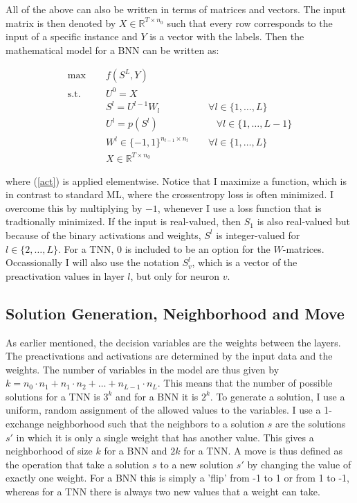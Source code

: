 \noindent All of the above can also be written in terms of matrices and vectors. The input matrix is then denoted by $X \in \mathbb{R}^{T \times n_0}$ such that every row corresponds to the input of a specific instance and $Y$ is a vector with the labels. Then the mathematical model for a BNN can be written as:

\begin{align}
    \label{obj} \max \;\quad  & f(S^L, Y) \\
    \label{c1} \mbox{s.t.}\quad  & U^0 = X \\
    \label{c2} & S^l = U^{l-1}W_l \quad \quad \quad \quad \quad \forall l \in \{1, \ldots, L\} \\
    \label{c3} & U^l = p(S^l) \quad \quad \quad \quad \quad \quad \forall l \in \{1, \ldots, L- 1\} \\
    \label{c4} & W^l \in \{-1, 1\}^{n_{l-1} \times n_l} \quad \quad \forall l \in \{1, \ldots, L\} \\
    \label{c5} & X \in \mathbb{R}^{T \times n_0}
\end{align}

\noindent where (\ref{act}) is applied elementwise. Notice that I maximize a function, which is in contrast to standard ML, where the crossentropy loss is often minimized. I overcome this by multiplying by $-1$, whenever I use a loss function that is tradtionally minimized. If the input is real-valued, then $S_1$ is also real-valued but because of the binary activations and weights, $S^l$ is integer-valued for $l\in \{2, \ldots, L\}$. For a TNN, 0 is included to be an option for the $W$-matrices. Occassionally I will also use the notation $S^l_v$, which is a vector of the preactivation values in layer $l$, but only for neuron $v$. 

\subsection{Solution Generation, Neighborhood and Move}

As earlier mentioned, the decision variables are the weights between the layers. The preactivations and activations are determined by the input data and the weights. The number of variables in the model are thus given by $k = n_0\cdot n_1 + n_1 \cdot n_2 + \ldots + n_{L-1} \cdot n_L$. This means that the number of possible solutions for a TNN is $3^k$ and for a BNN it is $2^k$. To generate a solution, I use a uniform, random assignment of the allowed values to the variables. I use a 1-exchange neighborhood such that the neighbors to a solution $s$ are the solutions $s'$ in which it is only a single weight that has another value. This gives a neighborhood of size $k$ for a BNN and $2k$ for a TNN. A move is thus defined as the operation that take a solution $s$ to a new solution $s'$ by changing the value of exactly one weight. For a BNN this is simply a 'flip' from -1 to 1 or from 1 to -1, whereas for a TNN there is always two new values that a weight can take. \\

